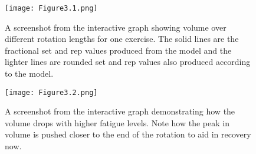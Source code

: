 \begin{figure}[h]
    \centering
    \texttt{[image: Figure3.1.png]}
    \caption{A screenshot from the interactive graph showing volume over different rotation lengths for one exercise. The solid lines are the fractional set and rep values produced from the model and the lighter lines are rounded set and rep values also produced according to the model.}
    \label{fig:Figure3.1}
\end{figure}
\begin{figure}[h]
    \centering
    \texttt{[image: Figure3.2.png]}
    \caption{A screenshot from the interactive graph demonstrating how the volume drops with higher fatigue levels. Note how the peak in volume is pushed closer to the end of the rotation to aid in recovery now.}
    \label{fig:Figure3.2}
\end{figure}
